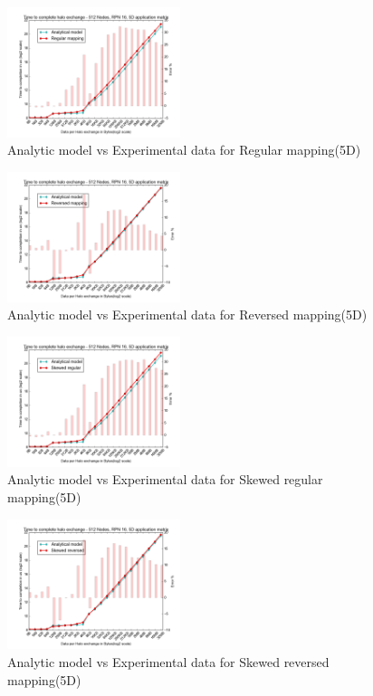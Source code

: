 \documentclass{acm_proc_article-sp}
\begin{document}
\begin{figure}
  \center
  \includegraphics[width=0.45\textwidth]{mappings/5d_regular_model.png}
  \caption{Analytic model vs Experimental data for Regular mapping(5D)}
    \label{fig:5D_regular_mapping}
\end{figure}

\begin{figure}
  \center
  \includegraphics[width=0.45\textwidth]{mappings/5d_reversed_model.png}
  \caption{Analytic model vs Experimental data for Reversed mapping(5D)}
    \label{fig:5D_reversed_mapping}
\end{figure}

\begin{figure}
  \center
  \includegraphics[width=0.45\textwidth]{mappings/5d_skewed_regular.png}
  \caption{Analytic model vs Experimental data for Skewed regular mapping(5D)}
    \label{fig:5D_skewed_regular_mapping}
\end{figure}

\begin{figure}
  \center
  \includegraphics[width=0.45\textwidth]{mappings/5d_skewed_reversed.png}
  \caption{Analytic model vs Experimental data for Skewed reversed mapping(5D)}
    \label{fig:5D_skewed_reversed_mapping}
\end{figure}
\end{document}
